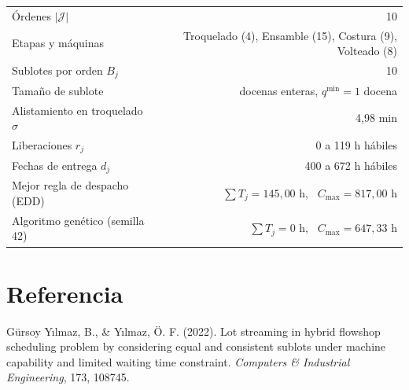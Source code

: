 \documentclass[11pt,a4paper]{article}
\newcommand{\J}{\mathcal{J}}
\begin{document}
\begin{center}
\begin{tabular}{lr}
\toprule
Órdenes $|\J|$ & 10 \\
Etapas y máquinas & Troquelado (4), Ensamble (15), Costura (9), Volteado (8) \\
Sublotes por orden $B_j$ & 10 \\
Tamaño de sublote & docenas enteras, $q^{\min} = 1$ docena \\
Alistamiento en troquelado $\sigma$ & 4,98 min \\
Liberaciones $r_j$ & 0 a 119 h hábiles \\
Fechas de entrega $d_j$ & 400 a 672 h hábiles \\
\midrule
Mejor regla de despacho (EDD) & $\sum T_j = 145{,}00$ h, \ $C_{\max} = 817{,}00$ h \\
Algoritmo genético (semilla 42) & $\sum T_j = 0$ h, \ $C_{\max} = 647{,}33$ h \\
\bottomrule
\end{tabular}
\end{center}

\section*{Referencia}
Gürsoy Yılmaz, B., \& Yılmaz, Ö. F. (2022). Lot streaming in hybrid flowshop
scheduling problem by considering equal and consistent sublots under machine
capability and limited waiting time constraint. \emph{Computers \& Industrial
Engineering}, 173, 108745.
\end{document}
